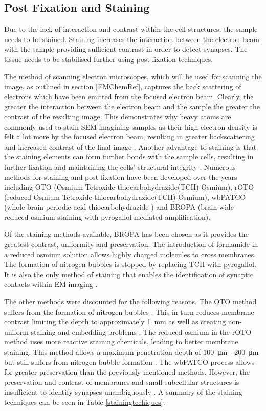 \documentclass[a4paper, 11pt]{article}
\numberwithin{equation}{section}
\begin{document}
\subsection{Post Fixation and Staining}
\label{postfixation}

Due to the lack of interaction and contrast within the cell structures, the sample needs to be stained. Staining increases the interaction between the electron beam with the sample providing sufficient contrast in order to detect synapses. The tissue needs to be stabilised further using post fixation techniques. 

The method of scanning electron microscopes, which will be used for scanning the image, as outlined in section \ref{EMChemRef}, captures the back scattering of electrons which have been emitted from the focused electron beam. Clearly, the greater the interaction between the electron beam and the sample the greater the contrast of the resulting image. This demonstrates why heavy atoms are commonly used to stain SEM imagining samples as their high electron density is felt a lot more by the focused electron beam, resulting in greater backscattering and increased contrast of the final image \cite{knott2008serial}. Another advantage to staining is that the staining elements can form further bonds with the sample cells, resulting in further fixation and maintaining the cells' structural integrity \cite{HeavyMetalsWatson}. Numerous methods for staining and post fixation have been developed over the years including OTO (Osmium Tetroxide-thiocarbohydrazide(TCH)-Osmium), rOTO (reduced Osmium Tetroxide-thiocarbohydrazide(TCH)-Osmium), wbPATCO (whole-brain periodic-acid-thiocarbohydrazide-) and BROPA (brain-wide reduced-osmium staining with pyrogallol-mediated amplification). 

Of the staining methods available, BROPA has been chosen as it provides the greatest contrast, uniformity and preservation. The introduction of formamide in a reduced osmium solution allows highly charged molecules to cross membranes. The formation of nitrogen bubbles is stopped by replacing TCH with pyrogallol. It is also the only method of staining that enables the identification of synaptic contacts within EM imaging \cite{highres_em_staining}.

The other methods were discounted for the following reasons. The OTO method suffers from the formation of nitrogen bubbles \cite{wholemousebrain2012}. This in turn reduces membrane contrast limiting the depth to approximately \SI{1}{\milli\meter} as well as creating non-uniform staining and embedding problems \cite{highres_em_staining}. The reduced osmium in the rOTO method uses more reactive staining chemicals, leading to better membrane staining. This method allows a maximum penetration depth of \SI{100}{\micro\metre} - \SI{200}{\micro\metre} but still suffers from nitrogen bubble formation \cite{OTOvsrOTO}. The wbPATCO process allows for greater preservation than the previously mentioned methods. However, the preservation and contrast of membranes and small subcellular structures is insufficient to identify synapses unambiguously \cite{highres_em_staining}. A summary of the staining techniques can be seen in Table \ref{stainingtechiques}.
\end{document}
